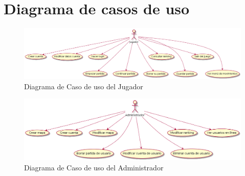 \section{Diagrama de casos de uso}\label{sec:uc}




  \begin{figure}[ht]
  \centering
  \includegraphics[width=1\textwidth]{./imatges/Jugador.png}
  \caption{Diagrama de Caso de uso del Jugador}
  \label{fig:usecase}
   \end{figure}
   
  \begin{figure}[ht]
  \centering
  \includegraphics[width=1\textwidth]{./imatges/Administrador.png}
  \caption{Diagrama de Caso de uso del Administrador}
  \label{fig:usecase}
   \end{figure}
